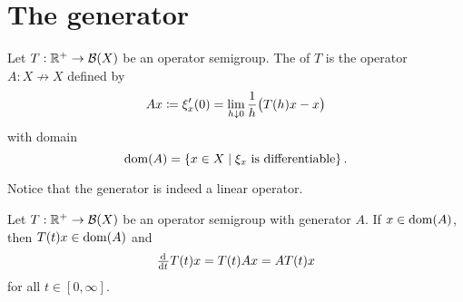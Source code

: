\section{The generator}
\begin{definition}
Let $T: \mathbb{R}^+\to \operatorname{\mathcal{B}}(X)$ be an operator semigroup. The  of $T$ is the operator $A: X\not\to X$ defined by
\[ Ax \coloneqq \xi_x'(0) = \lim_{h\downarrow 0}\frac{1}{h}\big(T(h)x - x\big) \]
with domain
\[ \operatorname{dom}(A) = \left\{ x\in X \;\middle|\; \text{$\xi_x$ is differentiable} \right\}. \]
\end{definition}
Notice that the generator is indeed a linear operator.

\begin{lemma} \label{differentialOperatorSemigroupGenerator}
Let $T: \mathbb{R}^+\to \operatorname{\mathcal{B}}(X)$ be an operator semigroup with generator $A$. If $x\in\operatorname{dom}(A)$, then $T(t)x\in\operatorname{dom}(A)$ and
\[ \od{}{t}T(t)x = T(t)Ax = AT(t)x \]
for all $t\in [0,\infty]$.
\end{lemma}

